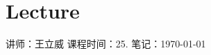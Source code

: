 \chapter{Lecture }

\begin{center}
    讲师：王立威 \qquad
    课程时间：25. \qquad 
    笔记：\today
\end{center}

\bigskip

